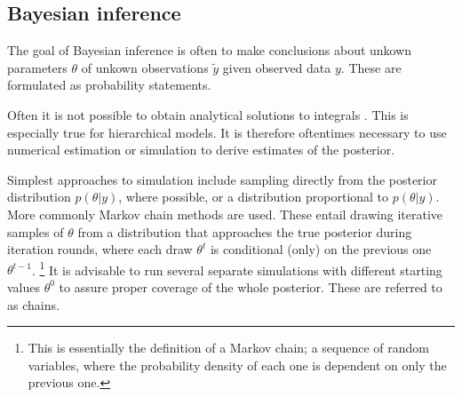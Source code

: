 


\subsection{Bayesian inference}\label{simulation}

The goal of Bayesian inference is often to make conclusions about unkown
parameters $\theta$ of unkown observations $\tilde{y}$ given observed data
$y$. These are formulated as probability statements.

Often it is not possible to obtain analytical solutions to integrals
. This is especially true for hierarchical models. It is therefore
oftentimes necessary to use numerical estimation or simulation to
derive estimates of the posterior.



Simplest approaches to simulation include sampling directly from the posterior
distribution $p(\theta|y)$, where possible, or a distribution proportional
to $p(\theta|y)$. More commonly Markov chain methods are used. These entail
drawing iterative samples of $\theta$ from a distribution that approaches
the true posterior during iteration rounds, where each draw $\theta^t$ is
conditional (only) on the previous one $\theta^{t-1}$.
\footnote{This is essentially the definition of a Markov chain; a sequence of random
variables, where the probability density of each one is dependent on only the
previous one.} It is advisable to run several separate simulations with
different starting values $\theta^0$ to assure proper coverage of the whole
posterior. These are referred to as chains.


